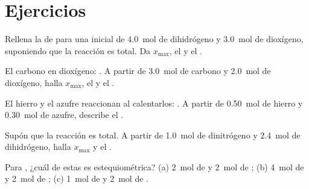\section{Ejercicios}

\begin{exercise}[$\star$]\label{exo:g10:reaction-progress-table:1}
Rellena la  de  para una 
inicial de \qty{4.0}{mol} de dihidrógeno y \qty{3.0}{mol} de dioxígeno,
suponiendo que la reacción es total. Da $x_{\max}$, el  y el .
\end{exercise}

\begin{exercise}[$\star$]\label{exo:g10:reaction-progress-table:2}
El carbono  en dioxígeno: . A partir de
\qty{3.0}{mol} de carbono y \qty{2.0}{mol} de dioxígeno, halla
$x_{\max}$, el  y el .
\end{exercise}

\begin{exercise}[$\star$]\label{exo:g10:reaction-progress-table:3}
El hierro y el azufre reaccionan al calentarlos: . A
partir de \qty{0.50}{mol} de hierro y \qty{0.30}{mol} de azufre,
describe el .
\end{exercise}

\begin{exercise}[$\star$]\label{exo:g10:reaction-progress-table:4}
Supón que la reacción  es total. A partir de
\qty{1.0}{mol} de dinitrógeno y \qty{2.4}{mol} de dihidrógeno, halla
$x_{\max}$ y el .
\end{exercise}

\begin{exercise}[$\star$]\label{exo:g10:reaction-progress-table:5}
Para , ¿cuál de estas  es estequiométrica?
(a) \qty{2}{mol} de  y \qty{2}{mol} de ; (b) \qty{4}{mol}
de  y \qty{2}{mol} de ; (c) \qty{1}{mol} de  y
\qty{2}{mol} de .
\end{exercise}

